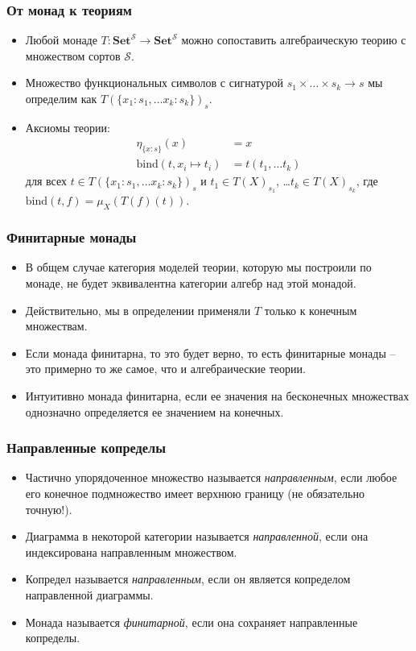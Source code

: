 \documentclass{beamer}
\theoremstyle{definition}
\newcommand{\cat}[1]{\mathbf{#1}}
\newcommand{\Set}{\cat{Set}}
\begin{document}
\begin{frame}
\frametitle{От монад к теориям}
\begin{itemize}
\item Любой монаде $T : \Set^\mathcal{S} \to \Set^\mathcal{S}$ можно сопоставить алгебраическую теорию с множеством сортов $\mathcal{S}$.
\item Множество функциональных символов с сигнатурой $s_1 \times \ldots \times s_k \to s$ мы определим как $T(\{ x_1 : s_1, \ldots x_k : s_k \})_s$.
\item Аксиомы теории:
\begin{align*}
\eta_{\{x : s\}}(x) & = x \\
\text{bind}(t, x_i \mapsto t_i) & = t(t_1, \ldots t_k)
\end{align*}
для всех $t \in T(\{ x_1 : s_1, \ldots x_k : s_k \})_s$ и $t_1 \in T(X)_{s_1}$, \ldots $t_k \in T(X)_{s_k}$,
где $\text{bind}(t,f) = \mu_X(T(f)(t))$.
\end{itemize}
\end{frame}

\begin{frame}
\frametitle{Финитарные монады}
\begin{itemize}
\item В общем случае категория моделей теории, которую мы построили по монаде, не будет эквивалентна категории алгебр над этой монадой.
\item Действительно, мы в определении применяли $T$ только к конечным множествам.
\item Если монада финитарна, то это будет верно, то есть финитарные монады -- это примерно то же самое, что и алгебраические теории.
\item Интуитивно монада финитарна, если ее значения на бесконечных множествах однозначно определяется ее значением на конечных.
\end{itemize}
\end{frame}

\begin{frame}
\frametitle{Направленные копределы}
\begin{itemize}
\item Частично упорядоченное множество называется \emph{направленным}, если любое его конечное подмножество имеет верхнюю границу (не обязательно точную!).
\item Диаграмма в некоторой категории называется \emph{направленной}, если она индексирована направленным множеством.
\item Копредел называется \emph{направленным}, если он является копределом направленной диаграммы.
\item Монада называется \emph{финитарной}, если она сохраняет направленные копределы.
\end{itemize}
\end{frame}
\end{document}
